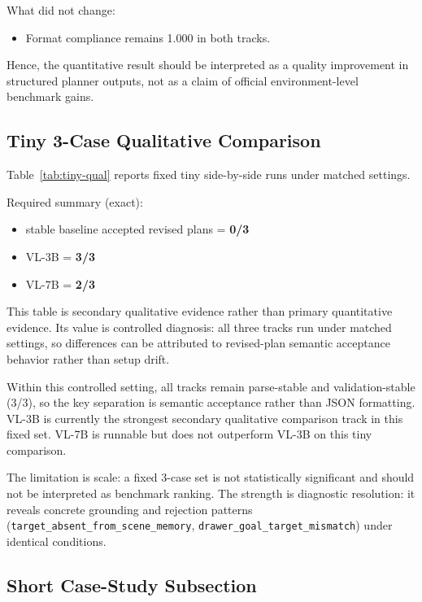 \documentclass{article}
\begin{document}
What did not change:
\begin{itemize}[leftmargin=*]
  \item Format compliance remains 1.000 in both tracks.
\end{itemize}

Hence, the quantitative result should be interpreted as a quality improvement in structured planner outputs, not as a claim of official environment-level benchmark gains.

\subsection{Tiny 3-Case Qualitative Comparison}
Table~\ref{tab:tiny-qual} reports fixed tiny side-by-side runs under matched settings.


Required summary (exact):
\begin{itemize}[leftmargin=*]
  \item stable baseline accepted revised plans = \textbf{0/3}
  \item VL-3B = \textbf{3/3}
  \item VL-7B = \textbf{2/3}
\end{itemize}

This table is secondary qualitative evidence rather than primary quantitative evidence. Its value is controlled diagnosis: all three tracks run under matched settings, so differences can be attributed to revised-plan semantic acceptance behavior rather than setup drift.

Within this controlled setting, all tracks remain parse-stable and validation-stable (3/3), so the key separation is semantic acceptance rather than JSON formatting. VL-3B is currently the strongest secondary qualitative comparison track in this fixed set. VL-7B is runnable but does not outperform VL-3B on this tiny comparison.

The limitation is scale: a fixed 3-case set is not statistically significant and should not be interpreted as benchmark ranking. The strength is diagnostic resolution: it reveals concrete grounding and rejection patterns (\texttt{target\_absent\_from\_scene\_memory}, \texttt{drawer\_goal\_target\_mismatch}) under identical conditions.

\subsection{Short Case-Study Subsection}

\end{document}
